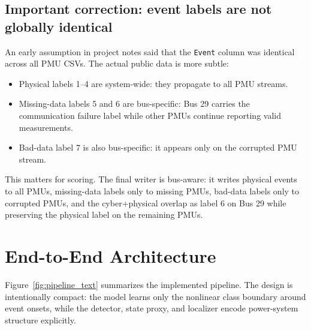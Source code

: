 \documentclass[11pt]{article}
\begin{document}
\subsection{Important correction: event labels are not globally identical}

An early assumption in project notes said that the \texttt{Event} column was
identical across all PMU CSVs. The actual public data is more subtle:

\begin{itemize}
  \item Physical labels 1--4 are system-wide: they propagate to all PMU streams.
  \item Missing-data labels 5 and 6 are bus-specific: Bus 29 carries the
  communication failure label while other PMUs continue reporting valid
  measurements.
  \item Bad-data label 7 is also bus-specific: it appears only on the corrupted
  PMU stream.
\end{itemize}

This matters for scoring. The final writer is bus-aware: it writes physical
events to all PMUs, missing-data labels only to missing PMUs, bad-data labels
only to corrupted PMUs, and the cyber+physical overlap as label 6 on Bus 29
while preserving the physical label on the remaining PMUs.

\section{End-to-End Architecture}

Figure~\ref{fig:pipeline_text} summarizes the implemented pipeline. The design is
intentionally compact: the model learns only the nonlinear class boundary around
event onsets, while the detector, state proxy, and localizer encode power-system
structure explicitly.
\end{document}
